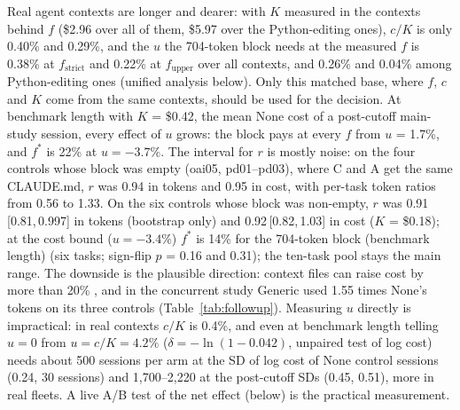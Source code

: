 \documentclass[11pt]{article}
\newcommand{\ci}[2]{\,[#1,\,#2]}
\newcommand{\aNone}{\textsf{None}\xspace}
\newcommand{\aGen}{\textsf{Generic}\xspace}
\begin{document}
Real agent contexts are longer and dearer: with $K$ measured in the contexts behind $f$ (\$2.96 over all of them, \$5.97 over the Python-editing ones), $c/K$ is only 0.40\% and 0.29\%, and the $u$ the 704-token block needs at the measured $f$ is 0.38\% at $f_\text{strict}$ and 0.22\% at $f_\text{upper}$ over all contexts, and 0.26\% and 0.04\% among Python-editing ones (unified analysis below). Only this matched base, where $f$, $c$ and $K$ come from the same contexts, should be used for the decision.
At benchmark length with $K$ = \$0.42, the mean \aNone cost of a post-cutoff main-study session, every effect of $u$ grows: the block pays at every $f$ from $u$ = 1.7\%, and $f^{*}$ is 22\% at $u = -3.7\%$.
The interval for $r$ is mostly noise: on the four controls whose block was empty (oai05, pd01--pd03), where C and A get the same CLAUDE.md, $r$ was 0.94 in tokens and 0.95 in cost, with per-task token ratios from 0.56 to 1.33.
On the six controls whose block was non-empty, $r$ was 0.91\ci{0.81}{0.997} in tokens (bootstrap only) and 0.92\ci{0.82}{1.03} in cost ($K$ = \$0.18); at the cost bound ($u = -3.4\%$) $f^{*}$ is 14\% for the 704-token block (benchmark length) (six tasks; sign-flip $p$ = 0.16 and 0.31); the ten-task pool stays the main range.
The downside is the plausible direction: context files can raise cost by more than 20\% \citep{gloaguen2026agentsmd}, and in the concurrent study \aGen used 1.55 times \aNone's tokens on its three controls (Table~\ref{tab:followup}).
Measuring $u$ directly is impractical: in real contexts $c/K$ is 0.4\%, and even at benchmark length telling $u = 0$ from $u = c/K = 4.2\%$ ($\delta = -\ln(1 - 0.042)$, unpaired test of log cost) needs about 500 sessions per arm at the SD of log cost of \aNone control sessions (0.24, 30 sessions) and 1,700--2,220 at the post-cutoff SDs (0.45, 0.51), more in real fleets. A live A/B test of the net effect (below) is the practical measurement.
\end{document}
